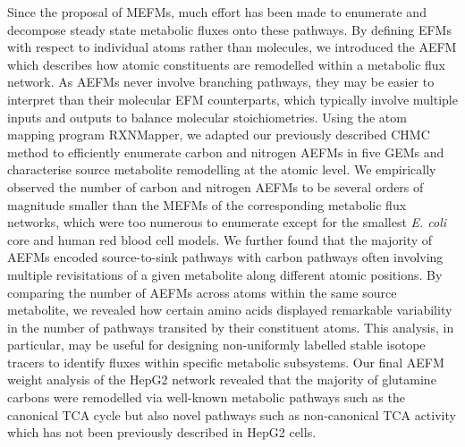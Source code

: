 \documentclass[12pt]{article}
\begin{document}
Since the proposal of MEFMs, much effort has been made to
enumerate and decompose steady state metabolic fluxes onto these pathways.
By defining EFMs with respect to individual atoms rather than molecules,
we introduced the AEFM which describes how atomic constituents are
remodelled within a metabolic flux network. As AEFMs never involve
branching pathways, they may be easier to interpret than their molecular
EFM counterparts, which typically involve multiple inputs and outputs to
balance molecular stoichiometries. Using the atom mapping program
RXNMapper, we adapted our previously described CHMC method to efficiently
enumerate carbon and nitrogen AEFMs in five GEMs and characterise source
metabolite remodelling at the atomic level. We empirically observed the
number of carbon and nitrogen AEFMs to be several orders of magnitude
smaller than the MEFMs of the corresponding metabolic flux networks, which
were too numerous to enumerate except for the smallest \textit{E. coli}
core and human red blood cell models. We further found that the majority
of AEFMs encoded source-to-sink pathways with carbon pathways often
involving multiple revisitations of a given metabolite along different
atomic positions. By comparing the number of AEFMs across atoms within the
same source metabolite, we revealed how certain amino acids displayed
remarkable variability in the number of pathways transited by their
constituent atoms. This analysis, in particular, may be useful for
designing non-uniformly labelled stable isotope tracers to identify fluxes
within specific metabolic subsystems. Our final AEFM weight analysis of
the HepG2 network revealed that the majority of glutamine carbons were
remodelled via well-known metabolic pathways such as the canonical TCA
cycle but also novel pathways such as non-canonical TCA activity which has
not been previously described in HepG2 cells.
\end{document}
